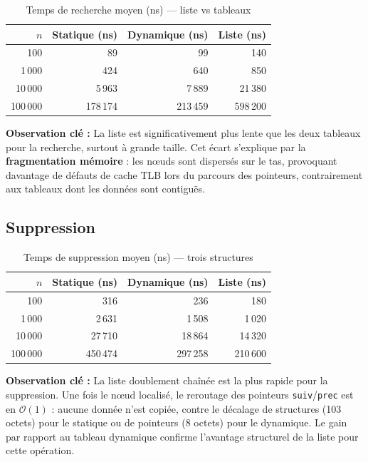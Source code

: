 \documentclass[12pt,a4paper]{report}
\begin{document}
\begin{table}[H]
\centering
\caption{Temps de recherche moyen (ns) — liste vs tableaux}
\label{tab:rech_liste}
\renewcommand{\arraystretch}{1.2}
\begin{tabular}{rrrr}
\toprule
$n$ & Statique (ns) & Dynamique (ns) & Liste (ns) \\
\midrule
100         &     89   &      99   &    140 \\
1\,000      &    424   &     640   &    850 \\
10\,000     &  5\,963  &   7\,889  & 21\,380 \\
100\,000    & 178\,174 & 213\,459  & 598\,200 \\
\bottomrule
\end{tabular}
\end{table}

\begin{boiteResultat}
\textbf{Observation clé :} La liste est significativement plus lente que les deux tableaux pour la recherche, surtout à grande taille. Cet écart s'explique par la \textbf{fragmentation mémoire} : les nœuds sont dispersés sur le tas, provoquant davantage de défauts de cache TLB lors du parcours des pointeurs, contrairement aux tableaux dont les données sont contiguës.
\end{boiteResultat}

\subsection{Suppression}

\begin{table}[H]
\centering
\caption{Temps de suppression moyen (ns) — trois structures}
\label{tab:suppr_liste}
\renewcommand{\arraystretch}{1.2}
\begin{tabular}{rrrr}
\toprule
$n$ & Statique (ns) & Dynamique (ns) & Liste (ns) \\
\midrule
100         &    316   &    236   &    180 \\
1\,000      &  2\,631  &  1\,508  &  1\,020 \\
10\,000     & 27\,710  & 18\,864  & 14\,320 \\
100\,000    & 450\,474 & 297\,258 & 210\,600 \\
\bottomrule
\end{tabular}
\end{table}

\begin{boiteResultat}
\textbf{Observation clé :} La liste doublement chaînée est la plus rapide pour la suppression. Une fois le nœud localisé, le reroutage des pointeurs \texttt{suiv}/\texttt{prec} est en $\mathcal{O}(1)$ : aucune donnée n'est copiée, contre le décalage de structures (103 octets) pour le statique ou de pointeurs (8 octets) pour le dynamique. Le gain par rapport au tableau dynamique confirme l'avantage structurel de la liste pour cette opération.
\end{boiteResultat}
\end{document}
